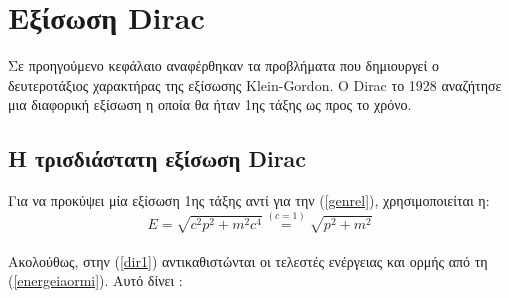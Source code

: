 \section{Εξίσωση \textlatin{Dirac}}

Σε προηγούμενο κεφάλαιο αναφέρθηκαν τα προβλήματα που δημιουργεί ο δευτεροτάξιος χαρακτήρας της εξίσωσης \textlatin{Klein-Gordon}. Ο \textlatin{Dirac} το 1928 αναζήτησε μια διαφορική εξίσωση η οποία θα ήταν 1ης τάξης ως προς το χρόνο.  \\
\subsection{Η τρισδιάστατη εξίσωση \textlatin{Dirac}}
Για να προκύψει μία εξίσωση 1ης τάξης αντί για την (\ref{genrel}), χρησιμοποιείται η:  
\\
\begin{equation}
  E= \sqrt{c^2p^2+m^2c^4}  \stackrel{(c=1)}{=} \sqrt{p^2+m^2} 
  \label{dir1} 
\end{equation} 
\\ 
Ακολούθως, στην (\ref{dir1}) αντικαθιστώνται οι τελεστές ενέργειας και ορμής από τη (\ref{energeiaormi}). Αυτό δίνει :
 
